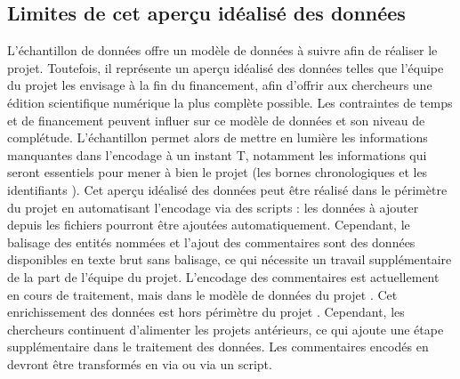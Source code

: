 \subsection{Limites de cet aperçu idéalisé des données}
L'échantillon de données offre un modèle de données à suivre afin de réaliser le projet. Toutefois, il représente un aperçu idéalisé des données telles que l'équipe du projet les envisage à la fin du financement, afin d'offrir aux chercheurs une édition scientifique numérique la plus complète possible. Les contraintes de temps et de financement peuvent influer sur ce modèle de données et son niveau de complétude. L'échantillon permet alors de mettre en lumière les informations manquantes dans l'encodage à un instant T, notamment les informations qui seront essentiels pour mener à bien le projet (les bornes chronologiques et les identifiants \XML). Cet aperçu idéalisé des données peut être réalisé dans le périmètre du projet en automatisant l'encodage via des scripts : les données à ajouter depuis les fichiers \JSON pourront être ajoutées automatiquement. Cependant, le balisage des entités nommées et l'ajout des commentaires sont des données disponibles en texte brut sans balisage, ce qui nécessite un travail supplémentaire de la part de l'équipe du projet. L'encodage des commentaires est actuellement en cours de traitement, mais dans le modèle de données du projet \LSC. Cet enrichissement des données \LSC est hors périmètre du projet \COREL. Cependant, les chercheurs continuent d'alimenter les projets antérieurs, ce qui ajoute une étape supplémentaire dans le traitement des données. Les commentaires encodés en \XML devront être transformés en \TEI via \XSLT ou via un script. 

